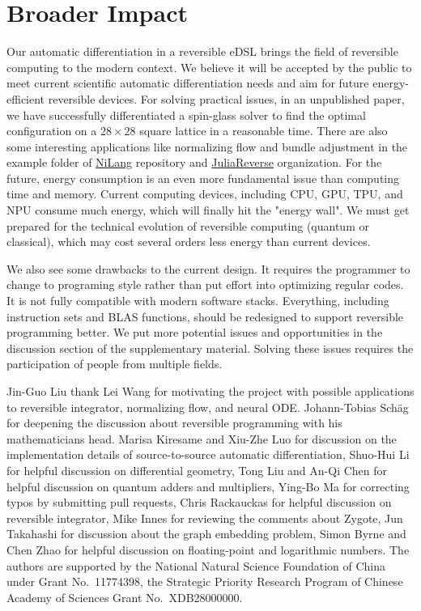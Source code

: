 \documentclass{article}
\newcommand{\<}{\langle}
\renewcommand{\>}{\rangle}
\theoremstyle{definition}\newtheorem{definition}{\textit{Definition}}
\begin{document}
\section*{Broader Impact}
Our automatic differentiation in a reversible eDSL brings the field of reversible computing to the modern context. We believe it will be accepted by the public to meet current scientific automatic differentiation needs and aim for future energy-efficient reversible devices.
For solving practical issues, in an unpublished paper, we have successfully differentiated a spin-glass solver to find the optimal configuration on a $28\times 28$ square lattice in a reasonable time. There are also some interesting applications like normalizing flow and bundle adjustment in the example folder of \href{https://github.com/GiggleLiu/NiLang.jl}{NiLang} repository and \href{https://github.com/JuliaReverse}{JuliaReverse} organization.
For the future, energy consumption is an even more fundamental issue than computing time and memory. Current computing devices, including CPU, GPU, TPU, and NPU consume much energy, which will finally hit the "energy wall". We must get prepared for the technical evolution of reversible computing (quantum or classical), which may cost several orders less energy than current devices.

We also see some drawbacks to the current design. It requires the programmer to change to programing style rather than put effort into optimizing regular codes. It is not fully compatible with modern software stacks. Everything, including instruction sets and BLAS functions, should be redesigned to support reversible programming better. We put more potential issues and opportunities in the discussion section of the supplementary material. Solving these issues requires the participation of people from multiple fields.

\begin{ack}
Jin-Guo Liu thank Lei Wang for motivating the project with possible applications to reversible integrator, normalizing flow, and neural ODE.
Johann-Tobias Schäg for deepening the discussion about reversible programming with his mathematicians head.
Marisa Kiresame and Xiu-Zhe Luo for discussion on the implementation details of source-to-source automatic differentiation,
Shuo-Hui Li for helpful discussion on differential geometry, Tong Liu and An-Qi Chen for helpful discussion on quantum adders and multipliers, Ying-Bo Ma for correcting typos by submitting pull requests, Chris Rackauckas for helpful discussion on reversible integrator, Mike Innes for reviewing the comments about Zygote, Jun Takahashi for discussion about the graph embedding problem, Simon Byrne and Chen Zhao for helpful discussion on floating-point and logarithmic numbers.
The authors are supported by the National Natural Science Foundation of China under Grant No.~11774398, the Strategic Priority Research Program of Chinese Academy of Sciences Grant No.~XDB28000000.
\end{ack}



\end{document}
